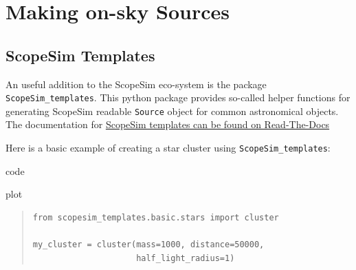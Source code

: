 

\section{Making on-sky Sources%
  \label{making-on-sky-sources}%
}


\subsection{ScopeSim Templates%
  \label{scopesim-templates}%
}

An useful addition to the ScopeSim eco-system is the package \texttt{ScopeSim\_templates}.
This python package provides so-called helper functions for generating ScopeSim readable \texttt{Source} object for common astronomical objects.
The documentation for \href{https://scopesim-templates.readthedocs.io/en/latest/}{ScopeSim templates can be found on Read-The-Docs}

Here is a basic example of creating a star cluster using \texttt{ScopeSim\_templates}:

\label{code-scopesim-templates-example}
\begin{DUclass}{code}
\begin{DUclass}{plot}
\begin{quote}
\begin{alltt}
\begin{lstlisting}[frame=single]
from scopesim_templates.basic.stars import cluster

my_cluster = cluster(mass=1000, distance=50000,
                     half_light_radius=1)
\end{lstlisting}
\end{alltt}
\end{quote}
\end{DUclass}
\end{DUclass}


